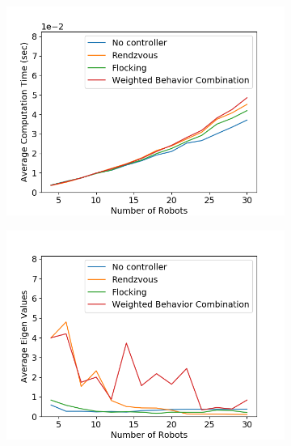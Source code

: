 \documentclass[../main.tex]{subfiles}
\begin{document}
\begin{figure}
\centering
\begin{subfigure}{0.49\textwidth}
\includegraphics[width=\textwidth]{img/new_avg_time.png}
\caption{}
\label{fig:avg_time}
\end{subfigure}
\begin{subfigure}{0.49\textwidth}
\includegraphics[width=\textwidth]{img/new_eigen.png}
\caption{}
\label{fig:eigen}
\end{subfigure}
\begin{subfigure}{0.49\textwidth}

\end{subfigure}
\end{figure}
\end{document}
